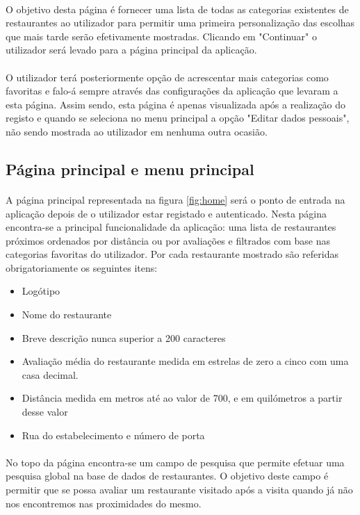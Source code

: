 \documentclass[a4paper,12pt]{scrreprt}
\begin{document}
\paragraph{}
O objetivo desta página é fornecer uma lista de todas as categorias existentes de restaurantes ao utilizador para permitir uma primeira personalização das escolhas que mais tarde serão efetivamente mostradas. 
Clicando em "Continuar" o utilizador será levado para a página principal da aplicação.
\paragraph{}
O utilizador terá posteriormente opção de acrescentar mais categorias como favoritas e falo-á sempre através das configurações da aplicação que levaram a esta página.
Assim sendo, esta página é apenas visualizada após a realização do registo e quando se seleciona no menu principal a opção "Editar dados pessoais", não sendo mostrada ao utilizador em nenhuma outra ocasião.
\subsection{Página principal e menu principal}
\paragraph{}
A página principal representada na figura \ref{fig:home} será o ponto de entrada na aplicação depois de o utilizador estar registado e autenticado. Nesta página encontra-se a principal funcionalidade da aplicação: uma lista de restaurantes próximos ordenados por distância ou por avaliações e filtrados com base nas categorias favoritas do utilizador.
Por cada restaurante mostrado são referidas obrigatoriamente os seguintes itens:
\begin{itemize}
  \item Logótipo 
  \item Nome do restaurante
  \item Breve descrição nunca superior a 200 caracteres
  \item Avaliação média do restaurante medida em estrelas de zero a cinco com uma casa decimal.
  \item Distância medida em metros até ao valor de 700, e em quilómetros a partir desse valor
  \item Rua do estabelecimento e número de porta
\end{itemize}
\paragraph{}
No topo da página encontra-se um campo de pesquisa que permite efetuar uma pesquisa global na base de dados de restaurantes. O objetivo deste campo é permitir que se possa avaliar um restaurante visitado após a visita quando já não nos encontremos nas proximidades do mesmo.
\end{document}
